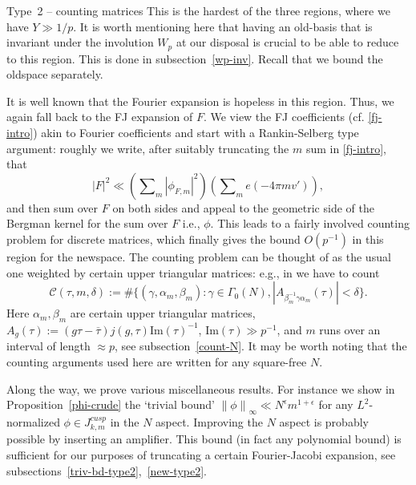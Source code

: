 \documentclass[11pt]{amsart}
\makeatletter
\numberwithin{equation}{section}
\renewcommand\subsubsection{\@secnumfont}{\bfseries}%
\renewcommand\subsubsection{\@startsection{subsubsection}{3}
  \z@{.5\linespacing\@plus.7\linespacing}{-.5em}%
  {\normalfont\bfseries}}
\theoremstyle{plain}
\theoremstyle{definition}
\newcommand{\propref}[1]{Proposition~\ref{#1}}
\newcommand{\mc}{\mathcal}
\newcommand{\mrm}{\mathrm}
\newcommand{\im}{\mrm{Im}}
\newcommand*{\norm}[1]{\left\lVert#1\right\rVert}
\newcommand{\sumn}{\sum \nolimits}
\newcommand{\jkmc}{J_{k,m}^{cusp}}
\makeatother
\begin{document}
\subsubsection{Type~2 -- counting matrices}
This is the hardest of the three regions, where we have $Y\gg 1/p$.
It is worth mentioning here that having an old-basis that is invariant under the involution $W_p$ at our disposal is crucial to be able to reduce to this region. This is done in subsection~\ref{wp-inv}. Recall that we bound the oldspace separately.

It is well known that the Fourier expansion is hopeless in this region. Thus, we again fall back to the FJ expansion of $F$. We view the FJ coefficients (cf. \eqref{fj-intro}) akin to Fourier coefficients and start with a Rankin-Selberg type argument: roughly we write, after suitably truncating the $m$ sum in \eqref{fj-intro}, that
\begin{equation}
    |F|^2 \ll (\sumn_m |\phi_{F,m}|^2) (\sumn_m e(- 4 \pi m v') ),
\end{equation}
and then sum over $F$ on both sides and appeal to the geometric side of the Bergman kernel for the sum over $F$ i.e., $\phi$. This leads to a fairly involved counting problem for discrete matrices, which finally gives the bound $O(p^{-1})$ in this region for the newspace. The counting problem can be thought of as the usual one weighted by certain upper triangular matrices: e.g., in we have to count
\begin{equation} \label{count-with-wt-intro}
    \mc C(\tau, m, \delta):= \#\{(\gamma, \alpha_{m}, \beta_{m}): \gamma\in \Gamma_0(N), |A_{\beta_{m}^{-1}\gamma\alpha_{m}}(\tau)|< \delta\}.
\end{equation}
Here $\alpha_m,\beta_m$ are certain upper triangular matrices, $\displaystyle A_g(\tau):= (g\tau-\overline{\tau})j(g,\tau)\im(\tau)^{-1}$, $\im(\tau) \gg p^{-1}$, and $m$ runs over an interval of length $\approx p$, see subsection~\ref{count-N}. It may be worth noting that the counting arguments used here are written for any square-free $N$.

Along the way, we prove various miscellaneous results. For instance we show in \propref{phi-crude} the `trivial bound' $\norm{\phi}_\infty \ll N^{\epsilon} m^{1+\epsilon}$ for any $L^2$-normalized $\phi \in \jkmc$ in the $N$ aspect. Improving the $N$ aspect is probably possible by inserting an  amplifier.
This bound (in fact any polynomial bound) is sufficient for our purposes of truncating a certain Fourier-Jacobi expansion, see subsections~\ref{triv-bd-type2},~\ref{new-type2}. 
\end{document}
